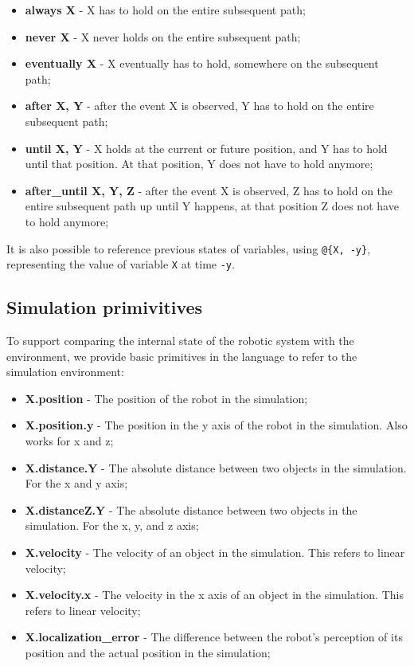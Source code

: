 \documentclass[runningheads]{llncs}
\begin{document}
\begin{itemize}
\item {\bfseries always X} - X has to hold on the entire subsequent path;
\item {\bfseries never X} - X never holds on the entire subsequent path;
\item {\bfseries eventually X} - X eventually has to hold, somewhere on the subsequent path;
\item {\bfseries after X, Y} - after the event X is observed, Y has to hold on the entire subsequent path;
\item {\bfseries until X, Y} - X holds at the current or future position, and Y has to hold until that position. At that position, Y does not have to hold anymore;
\item {\bfseries after\_until X, Y, Z} - after the event X is observed, Z has to hold on the entire subsequent path up until Y happens, at that position Z does not have to hold anymore;
\end{itemize}

\noindent It is also possible to reference previous states of variables, using \lstinline|@{X, -y}|, representing the value of variable \lstinline|X| at time \lstinline|-y|.

\subsection{Simulation primivitives}

To support comparing the internal state of the robotic system with the environment, we provide basic primitives in the language to refer to the simulation environment:

\begin{itemize}
\item {\bfseries X.position} - The position of the robot in the simulation;
\item {\bfseries X.position.y} - The position in the y axis of the robot in the simulation. Also works for x and z;
\item {\bfseries X.distance.Y} - The absolute distance between two objects in the simulation. For the x and y axis;
\item {\bfseries X.distanceZ.Y} - The absolute distance between two objects in the simulation. For the x, y, and z axis;
\item {\bfseries X.velocity} - The velocity of an object in the simulation. This refers to linear velocity;
\item {\bfseries X.velocity.x} - The velocity in the x axis of an object in the simulation. This refers to linear velocity;
\item {\bfseries X.localization\_error} - The difference between the robot's perception of its position and the actual position in the simulation;
\end{itemize}
\end{document}
